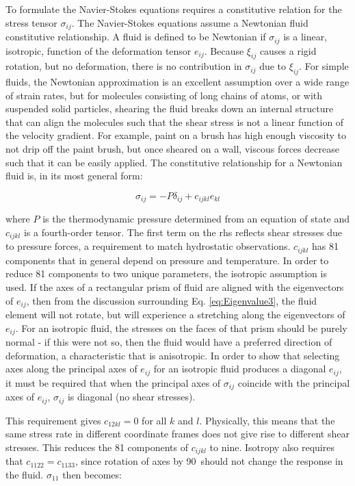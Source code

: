 \documentclass[10pt]{article}
\numberwithin{equation}{section} %
\begin{document}
To formulate the Navier-Stokes equations requires a constitutive relation for the stress tensor \(\sigma_{ij}\). The Navier-Stokes equations assume a Newtonian fluid constitutive relationship. A fluid is defined to be Newtonian if \(\sigma_{ij}\) is a linear, isotropic, function of the deformation tensor \(e_{ij}\). Because \(\xi_{ij}\) causes a rigid rotation, but no deformation, there is no contribution in \(\sigma_{ij}\) due to \(\xi_{ij}\). For simple fluids, the Newtonian approximation is an excellent assumption over a wide range of strain rates, but for molecules consisting of long chains of atoms, or with suspended solid particles, shearing the fluid breaks down an internal structure that can align the molecules such that the shear stress is not a linear function of the velocity gradient. For example, paint on a brush has high enough viscosity to not drip off the paint brush, but once sheared on a wall, viscous forces decrease such that it can be easily applied. The constitutive relationship for a Newtonian fluid is, in its most general form:

\begin{equation}
\label{eq:Newtonian1}
\sigma_{ij}=-P\delta_{ij}+c_{ijkl}e_{kl}
\end{equation}

where \(P\) is the thermodynamic pressure determined from an equation of state and \(c_{ijkl}\) is a fourth-order tensor. The first term on the \gls{rhs} reflects shear stresses due to pressure forces, a requirement to match hydrostatic observations. \(c_{ijkl}\) has 81 components that in general depend on pressure and temperature. In order to reduce 81 components to two unique parameters, the isotropic assumption is used. If the axes of a rectangular prism of fluid are aligned with the eigenvectors of \(e_{ij}\), then from the discussion surrounding Eq. \eqref{eq:Eigenvalue3}, the fluid element will not rotate, but will experience a stretching along the eigenvectors of \(e_{ij}\). For an isotropic fluid, the stresses on the faces of that prism should be purely normal - if this were not so, then the fluid would have a preferred direction of deformation, a characteristic that is anisotropic. In order to show that selecting axes along the principal axes of \(e_{ij}\) for an isotropic fluid produces a diagonal \(e_{ij}\), it must be required that when the principal axes of \(\sigma_{ij}\) coincide with the principal axes of \(e_{ij}\), \(\sigma_{ij}\) is diagonal (no shear stresses). 

This requirement gives \(c_{12kl}=0\) for all \(k\) and \(l\). Physically, this means that the same stress rate in different coordinate frames does not give rise to different shear stresses. This reduces the 81 components of \(c_{ijkl}\) to nine. Isotropy also requires that \(c_{1122}=c_{1133}\), since rotation of axes by 90\degree\ should not change the response in the fluid. \(\sigma_{11}\) then becomes:
\end{document}
